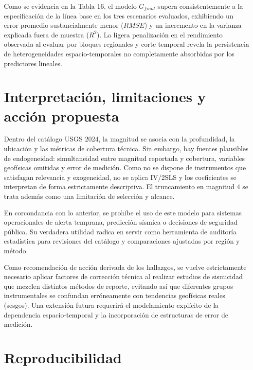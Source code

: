 \documentclass{style}
\begin{document}
Como se evidencia en la Tabla 16, el modelo $G_{final}$ supera consistentemente a la especificación de la línea base en los tres escenarios evaluados, exhibiendo un error promedio sustancialmente menor ($RMSE$) y un incremento en la varianza explicada fuera de muestra ($R^2$). La ligera penalización en el rendimiento observada al evaluar por bloques regionales y corte temporal revela la persistencia de heterogeneidades espacio-temporales no completamente absorbidas por los predictores lineales.


\section{Interpretación, limitaciones y acción propuesta}


Dentro del catálogo USGS 2024, la magnitud se asocia con la profundidad, la ubicación y las métricas de cobertura técnica. Sin embargo, hay fuentes plausibles de endogeneidad: simultaneidad entre magnitud reportada y cobertura, variables geofísicas omitidas y error de medición. Como no se dispone de instrumentos que satisfagan relevancia y exogeneidad, no se aplica IV/2SLS y los coeficientes se interpretan de forma estrictamente descriptiva. El truncamiento en magnitud 4 se trata además como una limitación de selección y alcance.


En corcondancia con lo anterior, se prohíbe el uso de este modelo para sistemas operacionales de alerta temprana, predicción sísmica o decisiones de seguridad pública. Su verdadera utilidad radica en servir como herramienta de auditoría estadística para revisiones del catálogo y comparaciones ajustadas por región y método. 

Como recomendación de acción derivada de los hallazgos, se vuelve estrictamente necesario aplicar factores de corrección técnica al realizar estudios de sismicidad que mezclen distintos métodos de reporte, evitando así que diferentes grupos instrumentales se confundan erróneamente con tendencias geofísicas reales (sesgos). Una extensión futura requerirá el modelamiento explícito de la dependencia espacio-temporal y la incorporación de estructuras de error de medición.


\section{Reproducibilidad}
\end{document}
